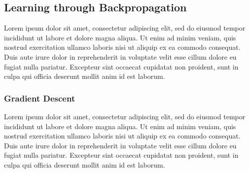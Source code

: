\subsection{Learning through Backpropagation}
Lorem ipsum dolor sit amet, consectetur adipiscing elit, sed do eiusmod tempor incididunt ut labore et dolore magna aliqua. Ut enim ad minim veniam, quis nostrud exercitation ullamco laboris nisi ut aliquip ex ea commodo consequat. Duis aute irure dolor in reprehenderit in voluptate velit esse cillum dolore eu fugiat nulla pariatur. Excepteur sint occaecat cupidatat non proident, sunt in culpa qui officia deserunt mollit anim id est laborum. \\

\subsubsection{Gradient Descent}
Lorem ipsum dolor sit amet, consectetur adipiscing elit, sed do eiusmod tempor incididunt ut labore et dolore magna aliqua. Ut enim ad minim veniam, quis nostrud exercitation ullamco laboris nisi ut aliquip ex ea commodo consequat. Duis aute irure dolor in reprehenderit in voluptate velit esse cillum dolore eu fugiat nulla pariatur. Excepteur sint occaecat cupidatat non proident, sunt in culpa qui officia deserunt mollit anim id est laborum. \\
